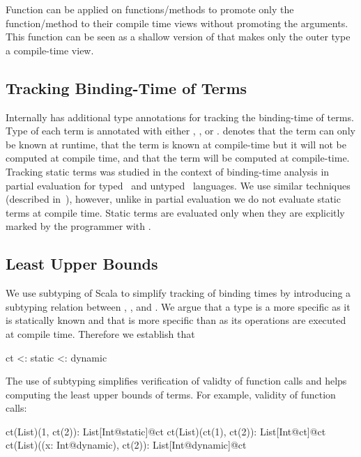 Function  can be applied on functions/methods to promote only the function/method
 to their compile time views without promoting the arguments. This function can be
 seen as a shallow version of  that makes only the outer type a compile-time view.

\subsection{Tracking Binding-Time of Terms}
\label{sct:static}


 Internally \tool has additional type annotations for tracking the binding-time of terms.
  Type of each term is annotated with either , , or .  denotes
  that the term can only be known at runtime,  that the term is known
  at compile-time but it will not be computed at compile time, and  that
  the term will be computed at compile-time.
 Tracking static terms was studied in the context of binding-time analysis
  in partial evaluation for typed~\cite{nielson_1988_automatic} and
  untyped~\cite{gomard1991partial} languages. We use similar techniques
  (described in~), however, unlike in partial evaluation we
  do not evaluate static terms at compile time. Static terms are evaluated only
  when they are explicitly marked by the programmer with .

\subsection{Least Upper Bounds}
\label{sct:lub}

 We use subtyping of Scala to simplify tracking of binding times by introducing a
 subtyping relation between , , and . We argue that
 a  type is a more specific  as it is statically known
 and that  is more specific than  as its operations are executed
 at compile time. Therefore we establish that\begin{lstparagraph}
                 ct <: static <: dynamic
\end{lstparagraph}

 The use of subtyping simplifies verification of validty of function calls and helps computing the
 least upper bounds of terms. For example, validity of function calls:\begin{lstparagraph}
ct(List)(1, ct(2)): List[Int@static]@ct
ct(List)(ct(1), ct(2)): List[Int@ct]@ct
ct(List)((x: Int@dynamic), ct(2)): List[Int@dynamic]@ct
\end{lstparagraph}

